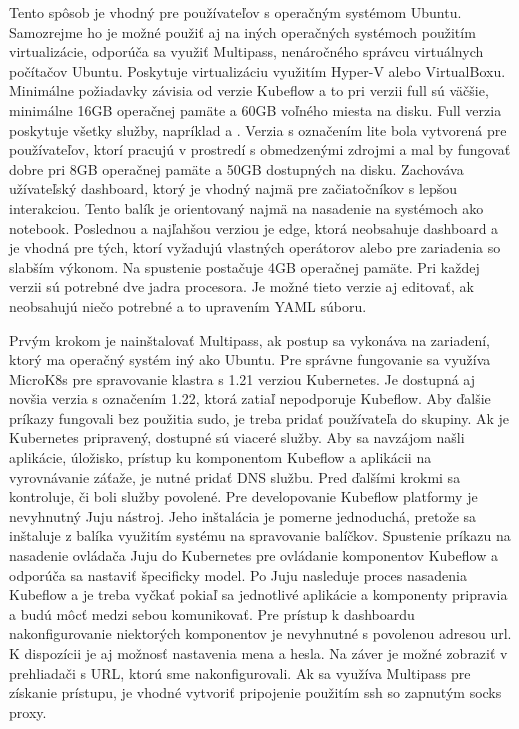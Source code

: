 Tento spôsob je vhodný pre používateľov s operačným systémom Ubuntu. Samozrejme ho je možné použiť aj na iných operačných systémoch použitím virtualizácie, odporúča sa využiť Multipass, nenáročného správcu virtuálnych počítačov Ubuntu. Poskytuje virtualizáciu využitím Hyper-V alebo VirtualBoxu. Minimálne požiadavky závisia od verzie Kubeflow a to pri verzii full sú väčšie, minimálne 16GB operačnej pamäte a 60GB voľného miesta na disku. Full verzia poskytuje všetky služby, napríklad  a . Verzia s označením lite bola vytvorená pre používateľov, ktorí pracujú v prostredí s obmedzenými zdrojmi a mal by fungovať dobre pri 8GB operačnej pamäte a 50GB dostupných na disku. Zachováva užívateľský dashboard, ktorý je vhodný najmä pre začiatočníkov s lepšou interakciou. Tento balík je orientovaný najmä na nasadenie na systémoch ako notebook. Poslednou a najľahšou verziou je edge, ktorá neobsahuje dashboard a je vhodná pre tých, ktorí vyžadujú vlastných operátorov alebo pre zariadenia so slabším výkonom. Na spustenie postačuje 4GB operačnej pamäte. Pri každej verzii sú potrebné dve jadra procesora. Je možné tieto verzie aj editovať, ak neobsahujú niečo potrebné a to upravením YAML súboru.

Prvým krokom je nainštalovať Multipass, ak postup sa vykonáva na zariadení, ktorý ma operačný systém iný ako Ubuntu. Pre správne fungovanie sa využíva MicroK8s pre spravovanie klastra s 1.21 verziou Kubernetes. Je dostupná aj novšia verzia s označením 1.22, ktorá zatiaľ nepodporuje Kubeflow. Aby ďalšie príkazy fungovali bez použitia sudo, je treba pridať používateľa do skupiny. Ak je Kubernetes pripravený, dostupné sú viaceré služby. Aby sa navzájom našli aplikácie, úložisko, prístup ku komponentom Kubeflow a aplikácii na vyrovnávanie záťaže, je nutné pridať DNS službu. Pred ďalšími krokmi sa kontroluje, či boli služby povolené. Pre developovanie Kubeflow platformy je nevyhnutný Juju nástroj. Jeho inštalácia je pomerne jednoduchá, pretože sa inštaluje z balíka využitím systému  na spravovanie balíčkov. Spustenie príkazu na nasadenie ovládača Juju do Kubernetes pre ovládanie komponentov Kubeflow a odporúča sa nastaviť špecificky model. Po Juju nasleduje proces nasadenia Kubeflow a je treba vyčkať pokiaľ sa jednotlivé aplikácie a komponenty pripravia a budú môcť medzi sebou komunikovať. Pre prístup k dashboardu nakonfigurovanie niektorých komponentov je nevyhnutné s povolenou adresou \acrshort{url}. K dispozícii je aj možnosť nastavenia mena a hesla. Na záver je možné zobraziť  v prehliadači s URL, ktorú sme nakonfigurovali. Ak sa využíva Multipass pre získanie prístupu, je vhodné vytvoriť pripojenie použitím \acrshort{ssh} so zapnutým \acrshort{socks} proxy.

